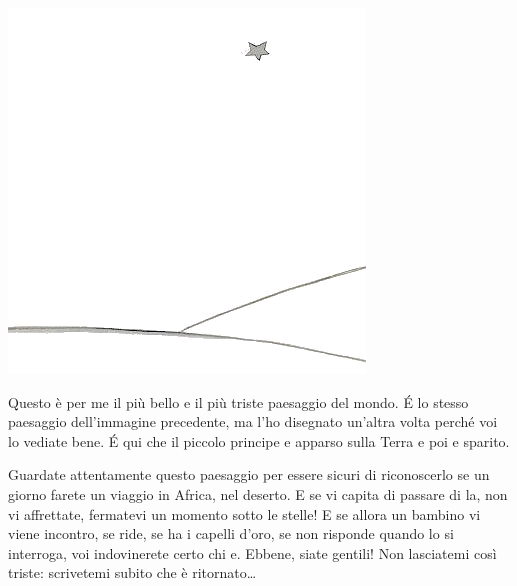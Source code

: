 \documentclass[11pt]{scrbook}
\begin{document}
\begin{center}
\includegraphics{img/27a}
\end{center}

Questo è per me il più bello e il più triste paesaggio del mondo. É lo
stesso paesaggio dell'immagine precedente, ma l'ho disegnato un'altra
volta perché voi lo vediate bene. É qui che il piccolo principe e
apparso sulla Terra e poi e sparito.

Guardate attentamente questo paesaggio per essere sicuri di riconoscerlo
se un giorno farete un viaggio in Africa, nel deserto. E se vi capita di
passare di la, non vi affrettate, fermatevi un momento sotto le stelle!
E se allora un bambino vi viene incontro, se ride, se ha i capelli
d'oro, se non risponde quando lo si interroga, voi indovinerete certo
chi e. Ebbene, siate gentili! Non lasciatemi così triste: scrivetemi
subito che è ritornato\ldots{}
\end{document}
